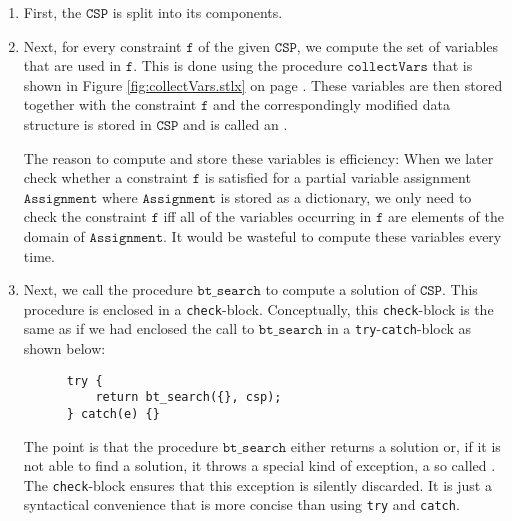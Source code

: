 \begin{enumerate}
\item First, the $\texttt{CSP}$ is split into its components.
\item Next, for every constraint $\texttt{f}$ of the given $\texttt{CSP}$, we compute the set of variables that
      are used in $\texttt{f}$.  This is done using the procedure $\texttt{collectVars}$ that is shown in
      Figure \ref{fig:collectVars.stlx} on page \pageref{fig:collectVars.stlx}.
      These variables are then stored together with the constraint $\texttt{f}$ and
      the correspondingly modified data structure is stored in $\texttt{CSP}$ and is called an
      .

      The reason to compute and store these variables is efficiency: When we later check whether a constraint $\texttt{f}$
      is satisfied for a partial variable assignment $\texttt{Assignment}$ where $\texttt{Assignment}$ is
      stored as a dictionary, we only need to check the constraint $\texttt{f}$ iff all of the variables occurring
      in $\texttt{f}$ are elements of the domain of $\texttt{Assignment}$.   It would be wasteful to compute
      these variables every time.
\item Next, we call the procedure $\texttt{bt\_search}$ to compute a solution of $\texttt{CSP}$.
      This procedure is enclosed in a \texttt{check}-block.  Conceptually, this \texttt{check}-block is the
      same as if we had enclosed the call to $\texttt{bt\_search}$ in a \texttt{try}-\texttt{catch}-block as
      shown below:
\begin{verbatim}
      try {
          return bt_search({}, csp);
      } catch(e) {}
\end{verbatim}
     The point is that the procedure $\texttt{bt\_search}$ either returns a solution or, if it is not able to
     find a solution, it throws a special kind of exception, a so called .
     The \texttt{check}-block ensures that this exception is silently discarded.  It is just a syntactical
     convenience that is more concise than using \texttt{try} and \texttt{catch}.
\end{enumerate}

